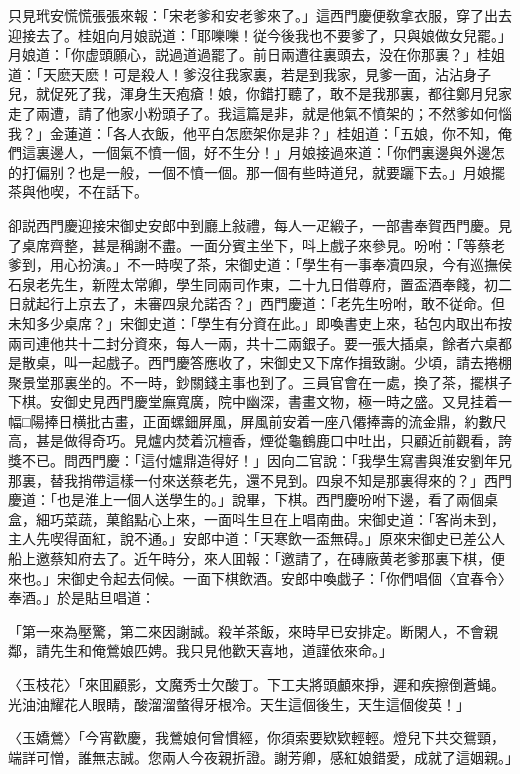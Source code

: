 只見玳安慌慌張張來報：「宋老爹和安老爹來了。」這西門慶便敎拿衣服，穿了出去迎接去了。桂姐向月娘説道：「耶嚛嚛！従今後我也不要爹了，只與娘做女兒罷。」月娘道：「你虚頭願心，説過道過罷了。前日兩遭往裏頭去，没在你那裏？」桂姐道：「天麽天麽！可是殺人！爹沒往我家裏，若是到我家，見爹一面，沾沾身子兒，就促死了我，渾身生天疱瘡！娘，你錯打聽了，敢不是我那裏，都往鄭月兒家走了兩遭，請了他家小粉頭子了。我這篇是非，就是他氣不憤架的；不然爹如何惱我？」金蓮道：「各人衣飯，他平白怎麽架你是非？」桂姐道：「五娘，你不知，俺們這裏邊人，一個氣不憤一個，好不生分！」月娘接過來道：「你們裏邊與外邊怎的打偏别？也是一般，一個不憤一個。那一個有些時道兒，就要躧下去。」月娘擺茶與他喫，不在話下。

卻説西門慶迎接宋御史安郎中到廳上敍禮，每人一疋緞子，一部書奉賀西門慶。見了桌席齊整，甚是稱謝不盡。一面分賓主坐下，呌上戲子來參見。吩咐：「等蔡老爹到，用心扮演。」不一時喫了茶，宋御史道：「學生有一事奉凟四泉，今有巡撫侯石泉老先生，新陞太常卿，學生同兩司作東，二十九日借尊府，置盃酒奉餞，初二日就起行上京去了，未審四泉允諾否？」西門慶道：「老先生吩咐，敢不従命。但未知多少桌席？」宋御史道：「學生有分資在此。」即喚書吏上來，毡包内取出布按兩司連他共十二封分資來，每人一兩，共十二兩銀子。要一張大插桌，餘者六桌都是散桌，叫一起戲子。西門慶答應收了，宋御史又下席作揖致謝。少頃，請去捲棚聚景堂那裏坐的。不一時，鈔關錢主事也到了。三員官會在一處，換了茶，擺棋子下棋。安御史見西門慶堂廡寬廣，院中幽深，書畫文物，極一時之盛。又見挂着一幅□陽捧日横批古畫，正面螺鈿屏風，屏風前安着一座八僊捧壽的流金鼎，約數尺高，甚是做得奇巧。見爐内焚着沉檀香，煙從龜鶴鹿口中吐出，只顧近前觀看，誇獎不已。問西門慶：「這付爐鼎造得好！」因向二官說：「我學生寫書與淮安劉年兄那裏，替我捎帶這樣一付來送蔡老先，還不見到。四泉不知是那裏得來的？」西門慶道：「也是淮上一個人送學生的。」說畢，下棋。西門慶吩咐下邊，看了兩個桌盒，細巧菜蔬，菓餡點心上來，一面呌生旦在上唱南曲。宋御史道：「客尚未到，主人先喫得面紅，說不通。」安郎中道：「天寒飲一盃無碍。」原來宋御史已差公人船上邀蔡知府去了。近午時分，來人囬報：「邀請了，在磚廠黄老爹那裏下棋，便來也。」宋御史令起去伺候。一面下棋飲酒。安郎中喚戯子：「你們唱個〈宜春令〉奉酒。」於是貼旦唱道：

「第一來為壓驚，第二來因謝誠。殺羊茶飯，來時早已安排定。断閑人，不會親鄰，請先生和俺鶯娘匹娉。我只見他歡天喜地，道謹依來命。」

〈玉枝花〉「來囬顧影，文魔秀士欠酸丁。下工夫將頭顱來掙，遲和疾擦倒蒼蝇。光油油耀花人眼睛，酸溜溜螫得牙根冷。天生這個後生，天生這個俊英！」

〈玉嬌鶯〉「今宵歡慶，我鶯娘何曾慣經，你須索要欵欵輕輕。燈兒下共交鴛頸，端詳可憎，誰無志誠。您兩人今夜親折證。謝芳卿，感紅娘錯愛，成就了這姻親。」

